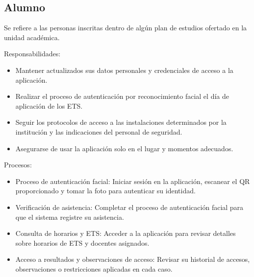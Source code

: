 \begin{Usuario}{\hypertarget{tAlumno}{\subsection{Alumno}}}{
		Se refiere a las personas inscritas dentro de algún plan de estudios ofertado en la unidad académica.
	}
	\item[Responsabilidades:] \cdtEmpty
	\begin{itemize}
		\item Mantener actualizados sus datos personales y credenciales de acceso a la aplicación.
		\item Realizar el proceso de autenticación por reconocimiento facial el día de aplicación de los ETS.
		\item Seguir los protocolos de acceso a las instalaciones determinados por la institución y las indicaciones del personal de seguridad.
		\item Asegurarse de usar la aplicación solo en el lugar y momentos adecuados.
	\end{itemize}
	
	\item[Procesos:] \cdtEmpty
	\begin{itemize}
		\item Proceso de autenticación facial: Iniciar sesión en la aplicación, escanear el QR proporcionado y tomar la foto para autenticar su identidad.
		\item Verificación de asistencia: Completar el proceso de autenticación facial para que el sistema registre su asistencia.
		\item Consulta de horarios y ETS: Acceder a la aplicación para revisar detalles sobre horarios de ETS y docentes asignados.
		\item Acceso a resultados y observaciones de acceso: Revisar su historial de accesos, observaciones o restricciones aplicadas en cada caso.
	\end{itemize}
\end{Usuario}

